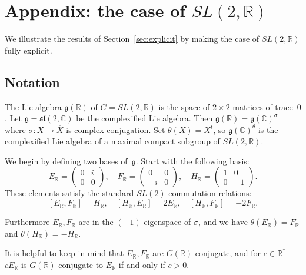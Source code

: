 \documentclass[cupthm]{CUP-JNL-JMJ}
\numberwithin{equation}{section}
\theoremstyle{cupplain}
\theoremstyle{cupdefinition}
\theoremstyle{cupremark}
\theoremstyle{cupproof}
\newcommand{\R}{\mathbb R}
\newcommand{\C}{\mathbb C}
\renewcommand{\sl}{\mathfrak s\mathfrak l}
\newcommand{\g}{\mathfrak g}
\begin{document}
\section{Appendix: the case of $SL(2,\R)$}\label{sec:appendix}

We illustrate the results of Section~\ref{sec:explicit} by making the case of $SL(2,\R)$ fully explicit.

\subsection{Notation}

The  Lie algebra $\g(\R)$  of $G=SL(2,\R)$  is the space of $2\times 2$  matrices of trace~$0$.
Let $\g=\sl(2,\C)$ be the complexified Lie algebra.
Then $\g(\R)=\g(\C)^\sigma$ where $\sigma\colon X \to \overline X$ is complex conjugation. 
Set $\theta(X)=X^t$, so $\g(\C)^\theta$  is the complexified Lie algebra of a maximal compact subgroup of $SL(2,\R)$.

We begin by defining two  bases of~$\g$. Start with the following basis:
$$
E_\R=\begin{pmatrix}0&i\\0&0\end{pmatrix},\quad 
F_\R=\begin{pmatrix}0&0\\-i&0\end{pmatrix},\quad
H_\R=\begin{pmatrix}1&0\\0&-1\end{pmatrix}.
$$
These elements satisfy the standard $SL(2)$ commutation relations: 
\[ [E_\R, F_\R] = H_\R, \quad [H_\R, E_\R] = 2E_\R, \quad [H_\R, F_\R] = -2F_\R. \]

Furthermore $E_\R,F_\R$ are in the $(-1)$-eigenspace of $\sigma$, and we have
$\theta(E_\R)=F_\R$ and $\theta(H_\R)=-H_\R$.

It is helpful to keep in mind that $E_\R,F_\R$ are $G(\R)$-conjugate,
and for $c\in \R^*$ $cE_\R$ is $G(\R)$-conjugate to $E_\R$ if and only if $c>0$.
\end{document}
